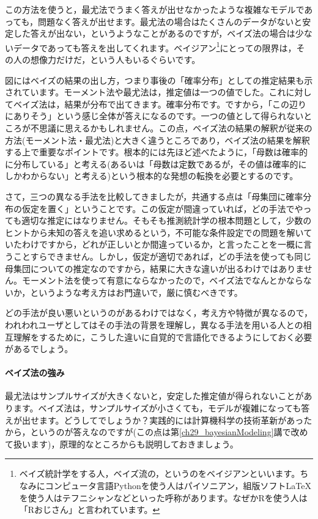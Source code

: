 \documentclass{ltjbook}
\begin{document}
この方法を使うと，最尤法でうまく答えが出せなかったような複雑なモデルであっても，問題なく答えが出せます。最尤法の場合はたくさんのデータがないと安定した答えが出ない，というようなことがあるのですが，ベイズ法の場合は少ないデータであっても答えを出してくれます。ベイジアン\footnote{ベイズ統計学をする人，ベイズ流の，というのをベイジアンといいます。ちなみにコンピュータ言語Pythonを使う人はパイソニアン，組版ソフト\LaTeX を使う人はテフニシャンなどといった呼称があります。なぜかRを使う人は「Rおじさん」と言われています。}にとっての限界は，その人の想像力だけだ，という人もいるぐらいです\parencite{Lee201709}。

図にはベイズの結果の出し方，つまり事後の「確率分布」としての推定結果も示されています。モーメント法や最尤法は，推定値は一つの値でした。これに対してベイズ法は，結果が分布で出てきます。確率分布です。ですから，「この辺りにありそう」という感じ全体が答えになるのです。一つの値として得られないところが不思議に思えるかもしれません。この点，ベイズ法の結果の解釈が従来の方法(モーメント法・最尤法)と大きく違うところであり，ベイズ法の結果を解釈する上で重要なポイントです。根本的には先ほど述べたように，「母数は確率的に分布している」と考える(あるいは「母数は定数であるが，その値は確率的にしかわからない」と考える)という根本的な発想の転換を必要とするのです。

さて，三つの異なる手法を比較してきましたが，共通する点は「母集団に確率分布の仮定を置く」ということです。この仮定が間違っていれば，どの手法でやっても適切な推定にはなりません。そもそも推測統計学の根本問題として，少数のヒントから未知の答えを追い求めるという，不可能な条件設定での問題を解いていたわけですから，どれが正しいとか間違っているか，と言ったことを一概に言うことすらできません。しかし，仮定が適切であれば，どの手法を使っても同じ母集団についての推定なのですから，結果に大きな違いが出るわけではありません。モーメント法を使って有意にならなかったので，ベイズ法でなんとかならないか，というような考え方はお門違いで，厳に慎むべきです。

どの手法が良い悪いというのがあるわけではなく，考え方や特徴が異なるので，われわれユーザとしてはその手法の背景を理解し，異なる手法を用いる人との相互理解をするために，こうした違いに自覚的で言語化できるようにしておく必要があるでしょう。

\paragraph{ベイズ法の強み}

最尤法はサンプルサイズが大きくないと，安定した推定値が得られないことがあります。ベイズ法は，サンプルサイズが小さくても，モデルが複雑になっても答えが出せます。どうしてでしょうか？実践的には計算機科学の技術革新があったから，というのが答えなのですが(この点は第\ref{ch29_bayesianModeling}講で改めて扱います)，原理的なところからも説明しておきましょう。
\end{document}
